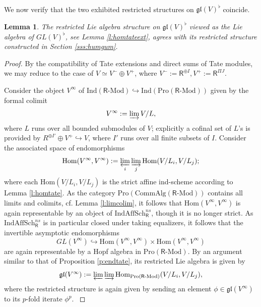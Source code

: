 \documentclass{amsart}
\newtheorem{Lem}[Thm]{Lemma}
\theoremstyle{definition}
\newcommand{\gl}{\mathfrak{gl}}
\newcommand{\Pro}{\on{Pro}}
\newcommand{\sss}{\subsubsection{}}
\newcommand{\Hom}{\on{Hom}}
\renewcommand{\mod}{\text{-}\on{Mod}}
\newcommand{\on}{\mathrm}
\newcommand{\Ring}{\mathsf{R}}
\numberwithin{equation}{section}
\begin{document}
{\sss We now verify that the two exhibited restricted structures on $\gl(V)^\flat$ coincide. 


\begin{Lem}\label{Lem:Tate_restricted_comparison} The restricted Lie algebra structure on $\gl(V)^\flat$ {viewed as the Lie algebra of $GL(V)^\flat$, see} Lemma \ref{l:homtateext}, agrees with its restricted structure constructed in Section \ref{sss:humgum}.

\end{Lem}


\begin{proof} By the compatibility of Tate extensions and direct sums of Tate modules, we may reduce to the case of $V \simeq V^- \oplus V^+$, where $V^- := \Ring^{\oplus I}, V^+ := \Ring^{\Pi J}$.

Consider the object $V^\infty$ of $\on{Ind}(\Ring\mod) \hookrightarrow \on{Ind}(\Pro(\Ring\mod))$ given by the formal colimit
$$V^\infty := \varinjlim V/L,$$
where $L$ runs over all bounded submodules of $V$; explicitly a cofinal set of $L$'s is provided by $R^{\oplus I'} \oplus V^+ \hookrightarrow  V$, where $I'$ runs over all finite subsets of $I$. Consider the associated space of endomorphisms 
$$\Hom(V^\infty, V^\infty) := \varprojlim_i \varinjlim_j \Hom(V/L_i, V/L_j);$$
where each $\Hom(V/L_i, V/L_j)$ is the strict affine ind-scheme according to  Lemma \ref{l:homtate}. As the category  $\Pro(\on{CommAlg}(\Ring\mod))$ contains all limits and  colimits, cf. Lemma \ref{l:limcolim}, it follows that $\Hom(V^\infty,V^\infty)$ is again representable by an object of $\on{IndAffSch}^{ns}_\Ring$, though it is no longer strict. As $\on{IndAffSch}^{ns}_{\Ring}$ is in particular closed under taking equalizers, it follows that the invertible asymptotic endomorphisms 
$$GL(V^\infty) \hookrightarrow \Hom(V^\infty, V^\infty) \times \Hom(V^\infty, V^\infty)$$are again representable by a  Hopf algebra in $\Pro(\Ring\mod)$. By an argument similar to that of Proposition \ref{p:endtate}, its restricted Lie algebra is given by 
$$\gl(V^\infty) := \varprojlim \varinjlim \Hom_{\Pro(\Ring\mod)}(V/L_i, V/L_j),$$
{ where the restricted structure is again given by sending an element $\phi \in \gl(V^\infty)$ to its $p$-fold iterate $\phi^p$. }


\end{proof}}
\end{document}

